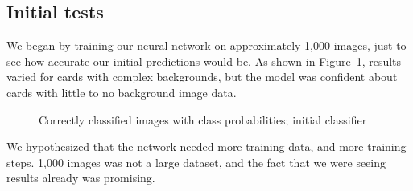 \documentclass[letterpaper]{article}
\begin{document}
\subsection{Initial tests}
We began by training our neural network on approximately 1,000 images, just to see how accurate our initial predictions would be. As shown in Figure~\ref{fig:initial_results_1}, results varied for cards with complex backgrounds, but the model was confident about cards with little to no background image data. 
\begin{figure}
  \centering

  \caption{\label{fig:initial_results_1} Correctly classified images with class probabilities; initial classifier}
\end{figure}


We hypothesized that the network needed more training data, and more training steps. 1,000 images was not a large dataset, and the fact that we were seeing results already was promising.
\end{document}
